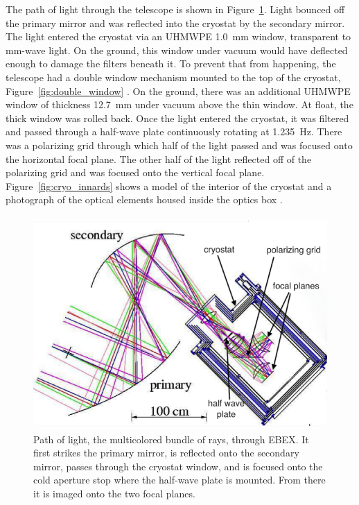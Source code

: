 The path of light through the telescope is shown in Figure~\ref{fig:optical_path}. 
Light bounced off the primary mirror and was reflected into the cryostat by the secondary mirror. 
The light entered the cryostat via an \ac{UHMWPE} 1.0~mm window, transparent to mm-wave light. 
On the ground, this window under vacuum would have deflected enough to damage the filters beneath it. 
To prevent that from happening, the telescope had a double window mechanism mounted to the top of the cryostat, Figure~\ref{fig:double_window} \cite{Zilic2017}. 
On the ground, there was an additional \ac{UHMWPE} window of thickness 12.7~mm under vacuum above the thin window. 
At float, the thick window was rolled back. 
Once the light entered the cryostat, it was filtered and passed through a half-wave plate continuously rotating at 1.235~Hz. %
There was a polarizing grid through which half of the light passed and was focused onto the horizontal focal plane.
The other half of the light reflected off of the polarizing grid and was focused onto the vertical focal plane. 
Figure~\ref{fig:cryo_innards} shows a model of the interior of the cryostat and a photograph of the optical elements housed inside the optics box \cite{EBEXPaper1}. 

\begin{figure}[htbp]
\begin{center}
\includegraphics[height=3.2in]{figures/ebex_optical_path.png}
\caption[EBEX optical path]{Path of light, the multicolored bundle of rays, through \ac{EBEX}. It first strikes the primary mirror, is reflected onto the secondary mirror, passes through the cryostat window, and is focused onto the cold aperture stop where the half-wave plate is mounted. From there it is imaged onto the two focal planes. 
\label{fig:optical_path} }
\end{center}
\end{figure}


